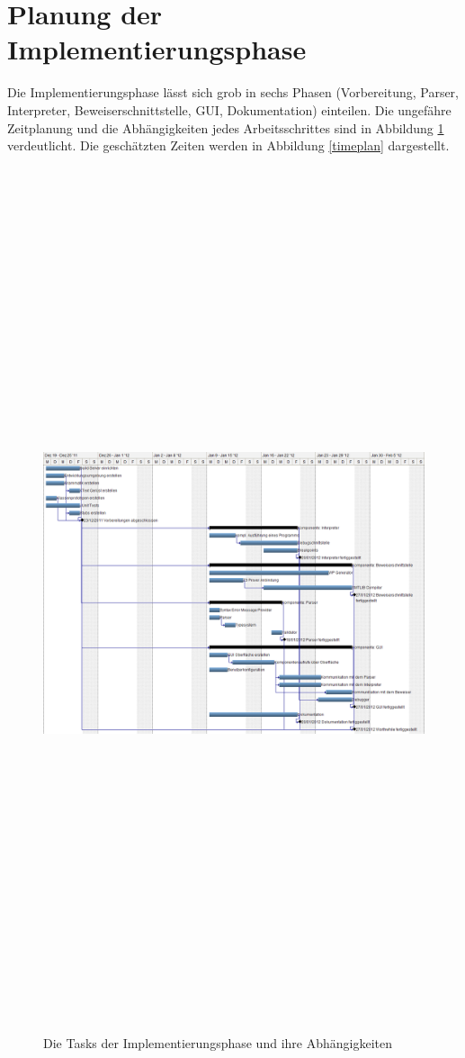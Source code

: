 \section{Planung der Implementierungsphase}

Die Implementierungsphase lässt sich grob in sechs Phasen (Vorbereitung, Parser, Interpreter, Beweiserschnittstelle, GUI, Dokumentation) einteilen. Die ungefähre Zeitplanung und die Abhängigkeiten jedes Arbeitsschrittes sind in Abbildung \ref{gantt_impl} verdeutlicht. Die geschätzten Zeiten werden in Abbildung \ref{timeplan} dargestellt.

\begin{figure}
	\centering
	\hspace*{-2cm}\vspace*{-2cm}\caption[B]{Die Tasks der Implementierungsphase und ihre Abhängigkeiten}
	\hspace*{-3cm}\vspace*{-3cm}\includegraphics[angle=90,width=19cm,height= 25cm]{diagrams/gantt_implementierung_diag.png}
	\label{gantt_impl}
\end{figure}

